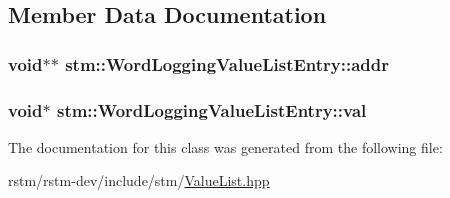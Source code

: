 \subsection{Member Data Documentation}
\hypertarget{classstm_1_1WordLoggingValueListEntry_a790d8c297504c4060b96c9e7acb398d4}{
\subsubsection[{addr}]{\setlength{\rightskip}{0pt plus 5cm}void$\ast$$\ast$ stm\-::\-Word\-Logging\-Value\-List\-Entry\-::addr\hspace{0.3cm}{\ttfamily [private]}}}\label{classstm_1_1WordLoggingValueListEntry_a790d8c297504c4060b96c9e7acb398d4}
\hypertarget{classstm_1_1WordLoggingValueListEntry_aa8106db3ea5806b5109a518adf99dd8a}{
\subsubsection[{val}]{\setlength{\rightskip}{0pt plus 5cm}void$\ast$ stm\-::\-Word\-Logging\-Value\-List\-Entry\-::val\hspace{0.3cm}{\ttfamily [private]}}}\label{classstm_1_1WordLoggingValueListEntry_aa8106db3ea5806b5109a518adf99dd8a}


The documentation for this class was generated from the following file\-:\begin{DoxyCompactItemize}
\item 
rstm/rstm-\/dev/include/stm/\hyperlink{ValueList_8hpp}{Value\-List.\-hpp}\end{DoxyCompactItemize}
